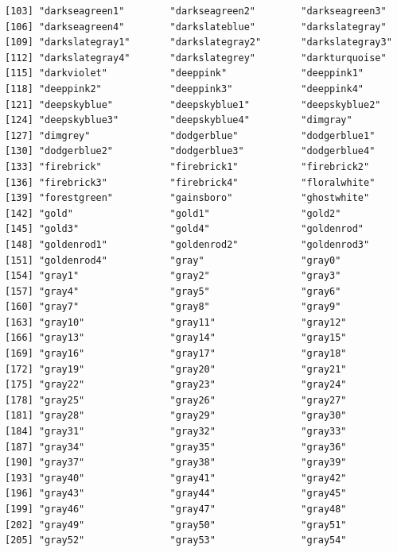 \documentclass[a4paperpaper,]{article}
\theoremstyle{definition}
\theoremstyle{definition}
\theoremstyle{definition}
\theoremstyle{remark}
\begin{document}
\begin{verbatim}
[103] "darkseagreen1"        "darkseagreen2"        "darkseagreen3"       
[106] "darkseagreen4"        "darkslateblue"        "darkslategray"       
[109] "darkslategray1"       "darkslategray2"       "darkslategray3"      
[112] "darkslategray4"       "darkslategrey"        "darkturquoise"       
[115] "darkviolet"           "deeppink"             "deeppink1"           
[118] "deeppink2"            "deeppink3"            "deeppink4"           
[121] "deepskyblue"          "deepskyblue1"         "deepskyblue2"        
[124] "deepskyblue3"         "deepskyblue4"         "dimgray"             
[127] "dimgrey"              "dodgerblue"           "dodgerblue1"         
[130] "dodgerblue2"          "dodgerblue3"          "dodgerblue4"         
[133] "firebrick"            "firebrick1"           "firebrick2"          
[136] "firebrick3"           "firebrick4"           "floralwhite"         
[139] "forestgreen"          "gainsboro"            "ghostwhite"          
[142] "gold"                 "gold1"                "gold2"               
[145] "gold3"                "gold4"                "goldenrod"           
[148] "goldenrod1"           "goldenrod2"           "goldenrod3"          
[151] "goldenrod4"           "gray"                 "gray0"               
[154] "gray1"                "gray2"                "gray3"               
[157] "gray4"                "gray5"                "gray6"               
[160] "gray7"                "gray8"                "gray9"               
[163] "gray10"               "gray11"               "gray12"              
[166] "gray13"               "gray14"               "gray15"              
[169] "gray16"               "gray17"               "gray18"              
[172] "gray19"               "gray20"               "gray21"              
[175] "gray22"               "gray23"               "gray24"              
[178] "gray25"               "gray26"               "gray27"              
[181] "gray28"               "gray29"               "gray30"              
[184] "gray31"               "gray32"               "gray33"              
[187] "gray34"               "gray35"               "gray36"              
[190] "gray37"               "gray38"               "gray39"              
[193] "gray40"               "gray41"               "gray42"              
[196] "gray43"               "gray44"               "gray45"              
[199] "gray46"               "gray47"               "gray48"              
[202] "gray49"               "gray50"               "gray51"              
[205] "gray52"               "gray53"               "gray54"              

\end{verbatim}
\end{document}
